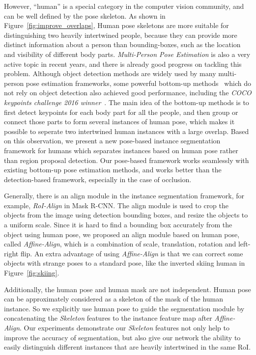 \documentclass[10pt,twocolumn,letterpaper]{article}
\begin{document}
However, ``human'' is a special category in the computer vision community, and can be well defined by the pose skeleton. As shown in Figure~\ref{fig:improve_overlaps}, Human pose skeletons are more suitable for distinguishing two heavily intertwined people, because they can provide more distinct information about a person than bounding-boxes, such as the location and visibility of different body parts. \emph{ Multi-Person Pose Estimation} is also a very active topic in recent years, and there is already good progress \cite{cao2017realtime,chen2017cascaded,fang2017rmpe,huang2017coarse,Newell2016Associative,papandreou2017towards} on tackling this problem.
Although object detection methods are widely used by many multi-person pose estimation frameworks, some powerful bottom-up methods~\cite{cao2017realtime,Newell2016Associative} which do not rely on object detection also achieved good performance, including the \emph{COCO keypoints challenge 2016 winner}~\cite{cao2017realtime}. 
The main idea of the bottom-up methods is to first detect keypoints for each body part for all the people, and then group or connect those parts to form several instances of human pose, which makes it possible to seperate two intertwined human instances with a large overlap. Based on this observation, we present a new pose-based instance segmentation framework for humans which separates instances based on human pose rather than region proposal detection. Our pose-based framework works seamlessly with existing bottom-up pose estimation methods, and works better than the detection-based framework, especially in the case of occlusion.


Generally, there is an align module in the instance segmentation framework, for example, \emph{RoI-Align} in Mask R-CNN. The align module is used to crop the objects from the image using detection bounding boxes, and resize the objects to a uniform scale. Since it is hard to find a bounding box accurately from the object using human pose, we proposed an align module based on human pose, called \emph{Affine-Align}, which is a combination of scale, translation, rotation and left-right flip. An extra advantage of using \emph{Affine-Align} is that we can correct some objects with strange poses to a standard pose, like the inverted skiing human in Figure~\ref{fig:skiing}. 

Additionally, the human pose and human mask are not independent. Human pose can be approximately considered as a skeleton of the mask of the human instance. So we explicitly use human pose to guide the segmentation module by concatenating the \emph{Skeleton} features to the instance feature map after \emph{Affine-Align}. Our experiments demonstrate our \emph{Skeleton} features not only help to improve the accuracy of segmentation, but also give our network the ability to easily distinguish different instances that are heavily intertwined in the same RoI.
\end{document}
